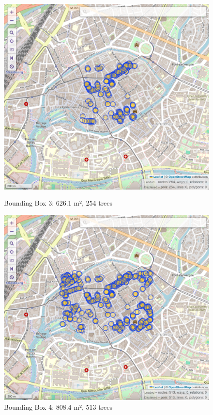\documentclass[12pt]{article}
\begin{document}
\begin{figure}[H]
    \centering
    \begin{minipage}{0.45\textwidth}
        \centering
        \includegraphics[width=\textwidth]{images/bbox3.png}
        \caption{Bounding Box 3: 626.1 m², 254 trees}
    \end{minipage}\hfill
    \begin{minipage}{0.45\textwidth}
        \centering
        \includegraphics[width=\textwidth]{images/bbox4.png}
        \caption{Bounding Box 4: 808.4 m², 513 trees}
    \end{minipage}
\end{figure}
\end{document}
